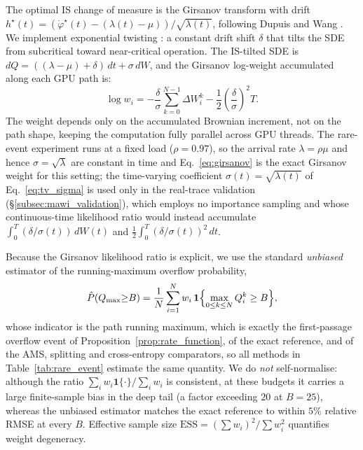 \documentclass{ieeeaccess}
\begin{document}
The optimal IS change of measure is the Girsanov transform with drift
$h^\star(t)=(\dot\varphi^\star(t)-(\lambda(t)-\mu))/\sqrt{\lambda(t)}$, following Dupuis and
Wang \cite{dupuis2007dynamic}. We implement exponential twisting \cite{dupuis2007dynamic}:
a constant drift shift $\delta$ that tilts the SDE from subcritical toward near-critical
operation. The IS-tilted SDE is
$dQ = ((\lambda-\mu) + \delta)\,dt + \sigma\,dW$, and the Girsanov log-weight
accumulated along each GPU path is:
\begin{equation}
\log w_i = -\frac{\delta}{\sigma}\sum_{k=0}^{N-1}\!\Delta W_i^k
    -\frac{1}{2}\!\left(\frac{\delta}{\sigma}\right)^2\!T.
\label{eq:girsanov}
\end{equation}
The weight depends only on the accumulated Brownian increment, not on the path shape, keeping
the computation fully parallel across GPU threads. The rare-event experiment runs at a fixed load
($\rho{=}0.97$), so the arrival rate $\lambda=\rho\mu$ and hence $\sigma=\sqrt{\lambda}$ are
constant in time and Eq.~\eqref{eq:girsanov} is the exact Girsanov weight for this setting; the
time-varying coefficient $\sigma(t)=\sqrt{\lambda(t)}$ of Eq.~\eqref{eq:tv_sigma} is used only in
the real-trace validation (\S\ref{subsec:mawi_validation}), which employs no importance sampling
and whose continuous-time likelihood ratio would instead accumulate
$\int_0^T(\delta/\sigma(t))\,dW(t)$ and $\tfrac12\int_0^T(\delta/\sigma(t))^2\,dt$.

Because the Girsanov likelihood ratio is explicit, we use the standard \emph{unbiased} estimator of
the running-maximum overflow probability,
\begin{equation}
\hat{P}(Q_{\max}{\ge}B) = \frac{1}{N}\sum_{i=1}^{N} w_i\,
\mathbf{1}\Bigl\{\max_{0\le k\le N}Q_i^k \ge B\Bigr\},
\label{eq:is_estimator}
\end{equation}
whose indicator is the path running maximum, which is exactly the first-passage overflow event of
Proposition~\ref{prop:rate_function}, of the exact reference, and of the AMS, splitting and
cross-entropy comparators, so all methods in Table~\ref{tab:rare_event} estimate the same quantity.
We do \emph{not} self-normalise: although the ratio $\sum_i w_i\mathbf 1\{\cdot\}/\sum_i w_i$ is
consistent, at these budgets it carries a large finite-sample bias in the deep tail (a factor
exceeding $20$ at $B{=}25$), whereas the unbiased estimator matches the exact reference to within
$5\%$ relative RMSE at every $B$. Effective sample size $\mathrm{ESS} = (\sum w_i)^2/\sum w_i^2$
quantifies weight degeneracy.
\end{document}
